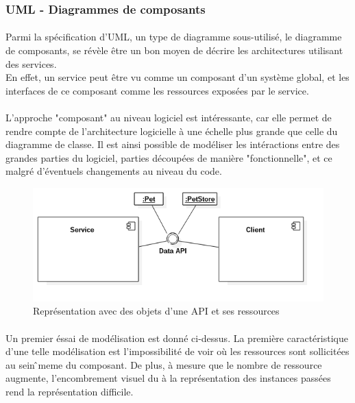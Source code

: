     \subsubsection{UML - Diagrammes de composants}
        \paragraph{}
            Parmi la spécification d'UML, un type de diagramme sous-utilisé, le diagramme de composants,
            se révèle être un bon moyen de décrire les architectures utilisant des services.\\
            En effet, un service peut être vu comme un composant d'un système global, et les interfaces
            de ce composant comme les ressources exposées par le service.

        \paragraph{}
            L'approche "composant" au niveau logiciel est intéressante, car elle permet de rendre compte
            de l'architecture logicielle à une échelle plus grande que celle du diagramme de classe.
            Il est ainsi possible de modéliser les intéractions entre des grandes parties du logiciel,
            parties découpées de manière "fonctionnelle", et ce malgré d'éventuels changements au niveau
            du code.

        \begin{figure}[h]
            \centering
            \includegraphics[scale=0.6]{./assets/UML/component1.png}
            \caption{Représentation avec des objets d'une API et ses ressources}
        \end{figure}

        \paragraph{}
            Un premier éssai de modélisation est donné ci-dessus. La première caractéristique d'une telle
            modélisation est l'impossibilité de voir où les ressources sont sollicitées au sein ̂meme
            du composant. De plus, à mesure que le nombre de ressource augmente,  l'encombrement visuel
            du à la représentation des instances passées rend la représentation difficile.

